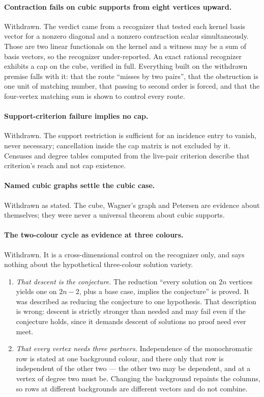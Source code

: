 \documentclass[11pt]{article}
\theoremstyle{definition}
\theoremstyle{remark}
\begin{document}
\paragraph{Contraction fails on cubic supports from eight vertices upward.}
Withdrawn. The verdict came from a recognizer that tested each kernel basis vector for
a nonzero diagonal and a nonzero contraction scalar simultaneously. Those are two
linear functionals on the kernel and a witness may be a sum of basis vectors, so the
recognizer under-reported. An exact rational recognizer exhibits a cap on the cube,
verified in full. Everything built on the withdrawn premise falls with it: that the
route ``misses by two pairs'', that the obstruction is one unit of matching number,
that passing to second order is forced, and that the four-vertex matching sum is shown
to control every route.

\paragraph{Support-criterion failure implies no cap.} Withdrawn. The support
restriction is sufficient for an incidence entry to vanish, never necessary;
cancellation inside the cap matrix is not excluded by it. Censuses and degree tables
computed from the live-pair criterion describe that criterion's reach and not cap
existence.

\paragraph{Named cubic graphs settle the cubic case.} Withdrawn as stated. The cube,
Wagner's graph and Petersen are evidence about themselves; they were never a universal
theorem about cubic supports.

\paragraph{The two-colour cycle as evidence at three colours.} Withdrawn. It is a
cross-dimensional control on the recognizer only, and says nothing about the
hypothetical three-colour solution variety.


\begin{enumerate}
\item \emph{That descent is the conjecture.} The reduction ``every solution on $2n$
vertices yields one on $2n-2$, plus a base case, implies the conjecture'' is proved.
It was described as reducing the conjecture to one hypothesis. That description is
wrong: descent is strictly stronger than needed and may fail even if the conjecture
holds, since it demands descent of solutions no proof need ever meet.

\item \emph{That every vertex needs three partners.} Independence of the
monochromatic row is stated at one background colour, and there only that row is
independent of the other two --- the other two may be dependent, and at a vertex of
degree two must be. Changing the background repaints the columns, so rows at
different backgrounds are different vectors and do not combine.
\end{enumerate}
\end{document}
